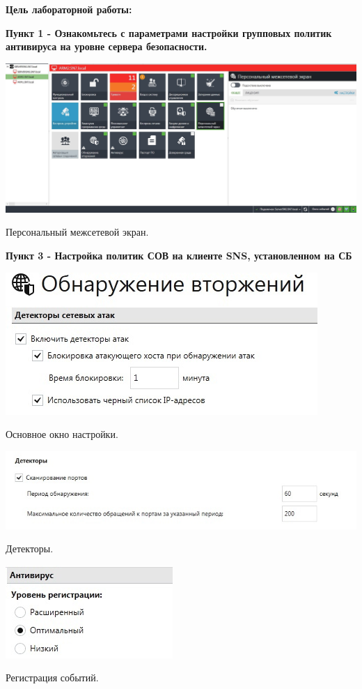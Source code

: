 \documentclass[a4paper,14pt]{extarticle}
\begin{document}
    \textbf{Цель лабораторной работы:}

    \textbf{Пункт 1 - Ознакомьтесь с параметрами настройки групповых политик антивируса на
уровне сервера безопасности.}
    \begin{center}
        \includegraphics[scale=0.3]{pics/1.jpg}

      Персональный межсетевой экран.
    \end{center}

    \textbf{Пункт 3 - Настройка политик СОВ на клиенте SNS, установленном на СБ}
    \begin{center}
        \includegraphics[scale=0.8]{pics/3_1.jpg}

        Основное окно настройки.

        \includegraphics[scale=0.65]{pics/3_2.jpg}

        Детекторы.

        \includegraphics[scale=0.8]{pics/3_3.jpg}
 
        Регистрация событий.
    \end{center}
\end{document}
